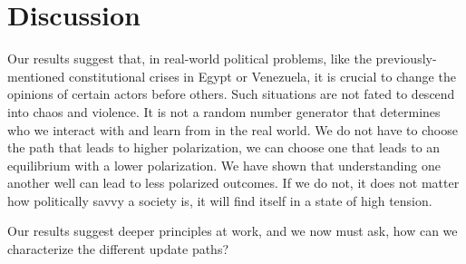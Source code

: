 \documentclass[11pt,letterpaper]{article}
\begin{document}
\section{Discussion}

Our results suggest that, in real-world political problems, 
like the previously-mentioned constitutional crises in Egypt or Venezuela,
it is crucial to change the opinions of certain actors before others. Such 
situations are not fated to descend into chaos and violence. It is not a
random number generator that determines who we interact with and learn from 
in the real world. We do not have to choose the path that leads to higher 
polarization, we can choose one that leads to an equilibrium with a lower
polarization.  We have shown that understanding one another well can lead to 
less polarized outcomes. If we do not, it does not matter how politically savvy
a society is, it will find itself in a state of high tension.

Our results suggest deeper principles at work, and we now must ask, how can
we characterize the different update paths?

\clearpage



\setlength{\bibleftmargin}{.125in}
\setlength{\bibindent}{-\bibleftmargin}


\end{document}
